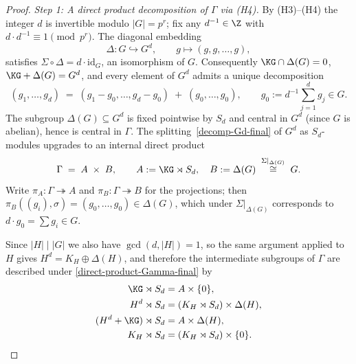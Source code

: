 \begin{proof}
\medskip
\textit{Step 1: A direct product decomposition of $\Gamma$ via (H4).}\quad
By (H3)--(H4) the integer $d$ is invertible modulo $|G| = p^r$; fix any
$d^{-1} \in \Z$ with $d \cdot d^{-1} \equiv 1 \pmod{p^r}$. The diagonal
embedding
\[
\Delta : G \hookrightarrow G^d, \qquad g \longmapsto (g, g, \ldots, g),
\]
satisfies $\Sigma \circ \Delta = d \cdot \mathrm{id}_G$, an isomorphism of $G$.
Consequently $\KG \cap \Delta(G) = 0$, $\KG + \Delta(G) = G^d$, and every
element of $G^d$ admits a unique decomposition
\begin{equation}\label{eq:decomp-Gd-final}
(g_1, \ldots, g_d) \;=\; (g_1 - g_0, \ldots, g_d - g_0) \;+\; (g_0, \ldots, g_0),
\qquad g_0 := d^{-1} \!\sum_{j=1}^d g_j \in G.
\end{equation}
The subgroup $\Delta(G) \subseteq G^d$ is fixed pointwise by $S_d$ and central
in $G^d$ (since $G$ is abelian), hence is central in $\Gamma$. The
splitting~\eqref{decomp-Gd-final} of $G^d$ as $S_d$-modules upgrades to an
internal direct product
\begin{equation}\label{eq:direct-product-Gamma-final}
\Gamma \;=\; A \;\times\; B,
\qquad
A := \KG \rtimes S_d, \quad
B := \Delta(G) \;\overset{\Sigma|_{\Delta(G)}}{\cong}\; G.
\end{equation}
Write $\pi_A : \Gamma \twoheadrightarrow A$ and
$\pi_B : \Gamma \twoheadrightarrow B$ for the projections; then
$\pi_B((g_i), \sigma) = (g_0, \ldots, g_0) \in \Delta(G)$, which under
$\Sigma|_{\Delta(G)}$ corresponds to $d \cdot g_0 = \sum g_i \in G$.

Since $|H| \mid |G|$ we also have $\gcd(d, |H|) = 1$, so the same argument
applied to $H$ gives $H^d = K_H \oplus \Delta(H)$, and therefore the
intermediate subgroups of $\Gamma$ are described under
\eqref{direct-product-Gamma-final} by
\begin{equation}\label{eq:subgroup-table}
\begin{aligned}
\KG \rtimes S_d              &= A \times \{0\}, \\
H^d \rtimes S_d              &= (K_H \rtimes S_d) \times \Delta(H), \\
(H^d + \KG) \rtimes S_d      &= A \times \Delta(H), \\
K_H \rtimes S_d              &= (K_H \rtimes S_d) \times \{0\}.
\end{aligned}
\end{equation}


\end{proof}
